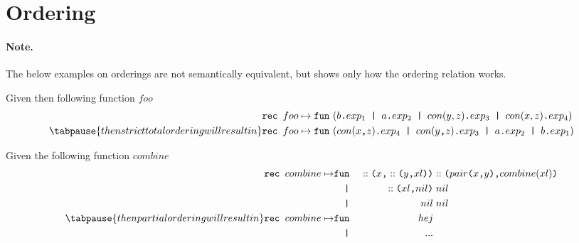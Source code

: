 
\newcommand{\patexp}[2]{#1 \texttt{.} #2}
\newcommand{\fargs}[2]{#1 \texttt{ | } #2}
\newcommand{\cargs}[2]{#1 \texttt{,} #2}
\newcommand{\con}[2]{#1 \texttt{(} #2 \texttt{)}}
\newcommand{\fcall}[2]{#1 \texttt{(} #2 \texttt{)}}
\newcommand{\pipe}{\phantom{\ttt{fu}}\ttt{|}}







\section{Ordering}

\paragraph{Note.} The below examples on orderings are not semantically
equivalent, but shows only how the ordering relation works.


\begin{example}
  Given then following function $foo$
  \begin{eqnarray*}[rl]
    \texttt{rec } foo & \mapsto \fun (b\ttt{.}exp_1 \texttt{ | } a\ttt{.}exp_2 \texttt{ | }
    con(y, z)\ttt{.}exp_3 \texttt{ | } con(x, z)\ttt{.}exp_4) \\
\tabpause{then strict total ordering will result in}
    \texttt{rec } foo & \mapsto \fun (con(x\texttt{,} z)\texttt{.}exp_4 \texttt{ |
    } con(y\texttt{,} z)\texttt{.}exp_3 \texttt{ | } a\texttt{.}exp_2 \texttt{ | }
    b\texttt{.}exp_1)
\end{eqnarray*}
\end{example}


\begin{example}
  Given the following function $combine$
  \begin{eqnarray*}[rll>{\ttt{.}}l]
    \texttt{rec } combine \mapsto 
    & \fun & \con{::}{\cargs{x}{\con{::}{\cargs{y}{xl}}}} & \fcall{::}{\cargs{\con{pair}{\cargs{x}{y}}}{combine(xl)}} \\
      & \pipe & \fcall{::}{\cargs{xl}{nil}} & \mathrel{nil} \\
      & \pipe & \mathrel{nil} & \mathrel{nil}\\
\tabpause{then partial ordering will result in}
    \texttt{rec } combine \mapsto 
    & \fun & hej \\
    & \pipe & ...
  \end{eqnarray*}
\end{example}


